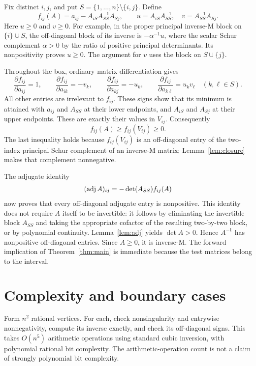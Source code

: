 Fix distinct $i,j$, and put $S=\{1,\ldots,n\}\setminus\{i,j\}$. Define
\[
 f_{ij}(A)=a_{ij}-A_{iS}A_{SS}^{-1}A_{Sj},\qquad
 u=A_{iS}A_{SS}^{-1},\quad v=A_{SS}^{-1}A_{Sj}.
\]
Here $u\ge0$ and $v\ge0$. For example, in the proper principal inverse-M block on $\{i\}\cup S$, the off-diagonal block of its inverse is $-\alpha^{-1}u$, where the scalar Schur complement $\alpha>0$ by the ratio of positive principal determinants. Its nonpositivity proves $u\ge0$. The argument for $v$ uses the block on $S\cup\{j\}$.

Throughout the box, ordinary matrix differentiation gives
\[
 \frac{\partial f_{ij}}{\partial a_{ij}}=1,\qquad
 \frac{\partial f_{ij}}{\partial a_{ik}}=-v_k,\qquad
 \frac{\partial f_{ij}}{\partial a_{kj}}=-u_k,\qquad
 \frac{\partial f_{ij}}{\partial a_{k\ell}}=u_kv_\ell
 \quad(k,\ell\in S).
\]
All other entries are irrelevant to $f_{ij}$. These signs show that its minimum is attained with $a_{ij}$ and $A_{SS}$ at their lower endpoints, and $A_{iS}$ and $A_{Sj}$ at their upper endpoints. These are exactly their values in $V_{ij}$. Consequently
\[
 f_{ij}(A)\ge f_{ij}(V_{ij})\ge0.
\]
The last inequality holds because $f_{ij}(V_{ij})$ is an off-diagonal entry of the two-index principal Schur complement of an inverse-M matrix; Lemma~\ref{lem:closure} makes that complement nonnegative.

The adjugate identity
\[
 (\operatorname{adj} A)_{ij}=-\det(A_{SS})f_{ij}(A)
\]
now proves that every off-diagonal adjugate entry is nonpositive. This identity does not require $A$ itself to be invertible: it follows by eliminating the invertible block $A_{SS}$ and taking the appropriate cofactor of the resulting two-by-two block, or by polynomial continuity. Lemma~\ref{lem:adj} yields $\det A>0$. Hence $A^{-1}$ has nonpositive off-diagonal entries. Since $A\ge0$, it is inverse-M. The forward implication of Theorem~\ref{thm:main} is immediate because the test matrices belong to the interval.
\section{Complexity and boundary cases}
Form $n^2$ rational vertices. For each, check nonsingularity and entrywise nonnegativity, compute its inverse exactly, and check its off-diagonal signs. This takes $O(n^5)$ arithmetic operations using standard cubic inversion, with polynomial rational bit complexity. The arithmetic-operation count is not a claim of strongly polynomial bit complexity.

